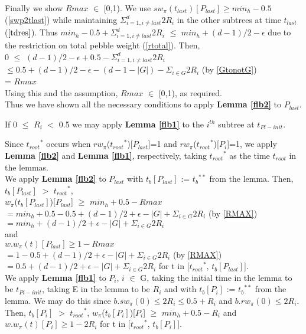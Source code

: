 \documentclass[12pt]{article}
\newcommand{\troot}{t_{root}}
\newcommand{\troots}{{t_{root}}^*}
\newcommand{\tbss}{{t_b}^{**}}
\newcommand{\tbith}{t_b[{P_i}]}
\newcommand{\tblast}{t_b[{P_{last}}]}
\begin{document}
Finally we show $Rmax$ $\in$ [0,1). We use $sw_{\pi}(t_{last})[P_{last}] \geq min_h-0.5$ (\ref{swp2tlast}) while maintaining $\Sigma_{i=1, i \ne last}^d 2R_i$ in the other subtrees at time $t_{last}$ ($\ref{tdres}$). Thus $min_h-0.5 + \Sigma_{i=1, i \ne last}^d 2R_i$ $\leq$ $min_h+(d-1)/2 -\epsilon$ due to the restriction on total pebble weight (\ref{rtotal}). Then,\\
0 $\leq$ $(d-1)/2 -\epsilon +0.5- \Sigma_{i=1, i \ne last}^d 2R_i$ \\
$\leq 0.5 + (d-1)/2 - \epsilon - (d-1-|G|) - \Sigma_{ i\in G} 2R_i$  (by \ref{GtonotG})\\
= $Rmax$\\
Using this and the assumption, $Rmax$ $\in$ [0,1), as required.\\


Thus we have shown all the necessary conditions to apply {\bf Lemma \ref{flb2}} to $P_{last}$.


If 0 ${\leq}$ $R_i$ ${<}$ 0.5 we may apply {\bf Lemma \ref{flb1}} to the $i^{th}$ subtree at $t_{Pi-init}$.

Since $\troots$ occurs when $rw_\pi$($\troots$)[$P_{last}$]=1 and $rw_\pi$($\troots$)[$P_i$]=1, we apply {\bf Lemma \ref{flb2}} and {\bf Lemma \ref{flb1}}, respectively, taking $\troots$ as the time $\troot$ in the lemmas.\\





\noindent
We apply {\bf Lemma \ref{flb2}} to $P_{last}$ with $\tblast$ := $\tbss$ from the lemma. Then, $\tblast$ $>$ $\troots$, \\
$w_{\pi}$($\tblast$)[$P_{last}$] $\geq$ $min_h + 0.5- Rmax$\\
$= min_h+0.5- 0.5 + (d-1)/2 + \epsilon - |G| + \Sigma_{ i\in G} 2R_i$ (by \ref{RMAX})\\
$= min_h + (d-1)/2 + \epsilon - |G| + \Sigma_{ i \in G} 2R_i$ \\
and \\
$w.w_\pi(t)[P_{last}] \geq 1 - Rmax$\\
$= 1- 0.5 + (d-1)/2 + \epsilon -|G| + \Sigma_{ i\in G} 2R_i$ (by \ref{RMAX})\\
$= 0.5 + (d-1)/2 + \epsilon - |G| + \Sigma_{ i \in G} 2R_i$ for t in [$\troots$, $\tblast$].\\

\noindent
We apply {\bf Lemma \ref{flb1}} to $P_i$, $i$ $\in$ G, taking the initial time in the lemma to be $t_{Pi-init}$, taking E in the lemma to be ${R_i}$ and with $\tbith$ := $\tbss$ from the lemma. We may do this since $b.sw_{\pi}(0) \leq 2{R_i} \leq 0.5+{R_i}$ and $b.rw_{\pi}(0) \leq 2{R_i}$. Then, $\tbith$ $>$ $\troots$, $w_{\pi}$($\tbith$)[$P_i$] $\geq$ $min_h + 0.5 - {R_i}$ and $w.w_\pi(t)[P_i] \geq 1 - 2{R_i}$ for t in [$\troots$, $\tbith$].\\
\end{document}
